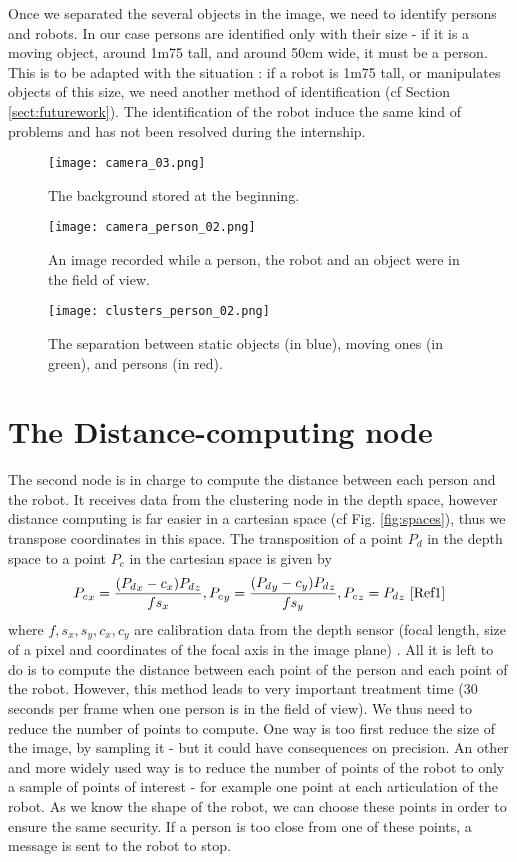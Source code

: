 \documentclass[smallextended]{svjour3}
\begin{document}
Once we separated the several objects in the image, we need to identify persons and robots. In our case persons are identified only with their size - if it is a moving object, around 1m75 tall, and around 50cm wide, it must be a person. This is to be adapted with the situation : if a robot is 1m75 tall, or manipulates objects of this size, we need another method of identification (cf Section \ref{sect:futurework}).
The identification of the robot induce the same kind of problems and has not been resolved during the internship.

\begin{figure}
\centering
\texttt{[image: camera\_03.png]}
\caption{\label{fig:background3}The background stored at the beginning.}
\end{figure}

\begin{figure}
\centering
\texttt{[image: camera\_person\_02.png]}
\caption{\label{fig:cameraperson2}An image recorded while a person, the robot and an object were in the field of view.}
\end{figure}

\begin{figure}
\centering
\texttt{[image: clusters\_person\_02.png]}
\caption{\label{fig:clustersperson2}The separation between static objects (in blue), moving ones (in green), and persons (in red).}
\end{figure}

\section{The Distance-computing node}

The second node is in charge to compute the distance between each person and the robot. It receives data from the clustering node in the depth space, however distance computing is far easier in a cartesian space (cf Fig. \ref{fig:spaces}), thus we transpose coordinates in this space. The transposition of a point $P_d$ in the depth space to a point $P_c$ in the cartesian space is given by \[{P_c}_x = \frac{({P_d}_x-c_x){P_d}_z}{fs_x}, {P_c}_y = \frac{({P_d}_y-c_y){P_d}_z}{fs_y}, {P_c}_z = {P_d}_z \text{ \cite{Ref1}} \]
where $f,s_x,s_y,c_x,c_y$ are calibration data from the depth sensor (focal length, size of a pixel and coordinates of the focal axis in the image plane) \cite{Ref1}.
All it is left to do is to compute the distance between each point of the person and each point of the robot. However, this method leads to very important treatment time (30 seconds per frame when one person is in the field of view). We thus need to reduce the number of points to compute. One way is too first reduce the size of the image, by sampling it - but it could have consequences on precision. An other and more widely used way is to reduce the number of points of the robot to only a sample of points of interest - for example one point at each articulation of the robot. As we know the shape of the robot, we can choose these points in order to ensure the same security. If a person is too close from one of these points, a message is sent to the robot to stop.
\end{document}

